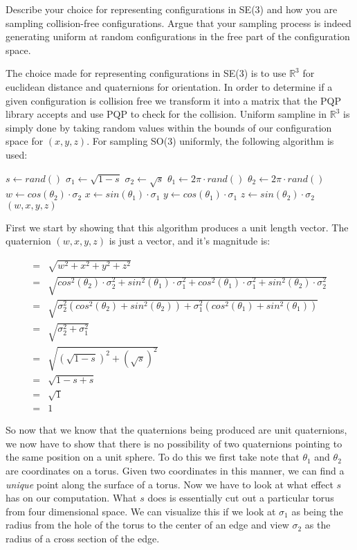 \question{[5]}

Describe your choice for representing configurations in SE(3) and how you are
sampling collision-free configurations. Argue that your sampling process
is indeed generating uniform at random configurations in the free
part of the configuration space.

The choice made for representing configurations in SE(3) is to use
$\mathbb{R}^3$ for euclidean distance and quaternions for orientation.
In order to determine if a given configuration is collision free we transform
it into a matrix that the PQP library accepts and use PQP to check for the
collision. Uniform sampline in $\mathbb{R}^3$ is simply done by taking random
values within the bounds of our configuration space for $(x, y, z)$.
For sampling SO(3) uniformly, the following algorithm is used:

\begin{algorithm}[H]
	$s \gets rand()$\;
	$\sigma_1 \gets \sqrt{1-s}$\;
	$\sigma_2 \gets \sqrt{s}$\;
	$\theta_1 \gets 2\pi \cdot rand()$\;
	$\theta_2 \gets 2\pi \cdot rand()$\;
	$w \gets cos(\theta_2) \cdot \sigma_2$\;
	$x \gets sin(\theta_1) \cdot \sigma_1$\;
	$y \gets cos(\theta_1) \cdot \sigma_1$\;
	$z \gets sin(\theta_2) \cdot \sigma_2$\;
	$(w,x,y,z)$
\end{algorithm}

First we start by showing that this algorithm produces a unit length vector.
The quaternion $(w, x, y, z)$ is just a vector, and it's magnitude is:

\begin{align*}
  = &\sqrt{w^2 + x^2 + y^2 + z^2} \\
  = &\sqrt{cos^2(\theta_2)\cdot\sigma_2^2 + sin^2(\theta_1)\cdot\sigma_1^2 + cos^2(\theta_1)\cdot\sigma_1^2 + sin^2(\theta_2)\cdot\sigma_2^2} \\
  = &\sqrt{\sigma_2^2(cos^2(\theta_2) + sin^2(\theta_2)) + \sigma_1^2(cos^2(\theta_1) + sin^2(\theta_1))} \\
  = &\sqrt{\sigma_2^2 + \sigma_1^2} \\
  = &\sqrt{(\sqrt{1-s})^2 + (\sqrt{s})^2} \\
  = &\sqrt{1 - s + s} \\
  = &\sqrt{1} \\
  = &1
\end{align*}

So now that we know that the quaternions being produced are unit quaternions,
we now have to show that there is no possibility of two quaternions pointing
to the same position on a unit sphere. To do this we first take note that
$\theta_1$ and $\theta_2$ are coordinates on a torus. Given two coordinates in
this manner, we can find a \emph{unique} point along the surface of a torus.
Now we have to look at what effect $s$ has on our computation. What $s$ does
is essentially cut out a particular torus from four dimensional space. We can
visualize this if we look at $\sigma_1$ as being the radius from the hole
of the torus to the center of an edge and view $\sigma_2$ as the radius of a
cross section of the edge.


